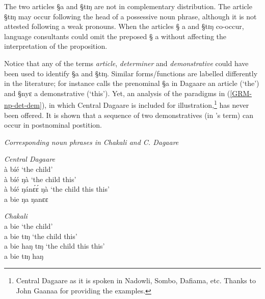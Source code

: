 The two  articles {\S a} and {\S tɪŋ}  are not in complementary distribution.
The article {\S tɪŋ} may occur following the head of a possessive noun phrase,
although it is not attested  following a weak pronouns. When the articles {\S
a} and {\S tɪŋ} co-occur,  language consultants could omit
the preposed {\S
a}  without affecting the interpretation of the
 proposition. 

Notice that any of the terms {\it article}, {\it determiner} and
{\it demonstrative} could have been used to identify {\S a} and {\S tɪŋ}.
Similar forms/functions are labelled differently in the
literature; for instance \citet[47]{Bodo97} calls the prenominal {\S a} in
Dagaare an article (`the')  and  {\S nyɛ} a demonstrative (`this').  Yet, an
analysis of the paradigms in (\ref{GRM-np-det-dem}),  in which Central Dagaare
is
included for illustration,\footnote{Central Dagaare as it is spoken in Nadowli,
Sombo, Dafiama, etc. Thanks to John Gaanaa for providing the examples. } has
never been offered. It is shown that a sequence of two demonstratives (in
\citeauthor{Bodo97}'s term)  can occur in postnominal postition.


\begin{exe}
 \ex\label{GRM-np-det-dem}{\it Corresponding  noun phrases in Chakali and
C.  Dagaare} 
\begin{xlist}
\begin{multicols}{2}

 \ex\label{GRM-np-det-dem-dag}{\it Central Dagaare}\\
à bíé   `the child'\\
à bíé ŋà   `the child this'\\
à bíé  ŋánɛ́ɛ́ ŋà  `the child this this'\\
 \textasteriskcentered  a bie  ŋa ŋanɛɛ  

 \ex\label{GRM-np-det-dem-cli}{\it Chakali}\\
a bie   `the child'\\
a bie tɪŋ   `the child this'\\
a bie haŋ tɪŋ  `the child this this'\\
 \textasteriskcentered a bie  tɪŋ haŋ  

\end{multicols}
 \end{xlist}
\end{exe}





